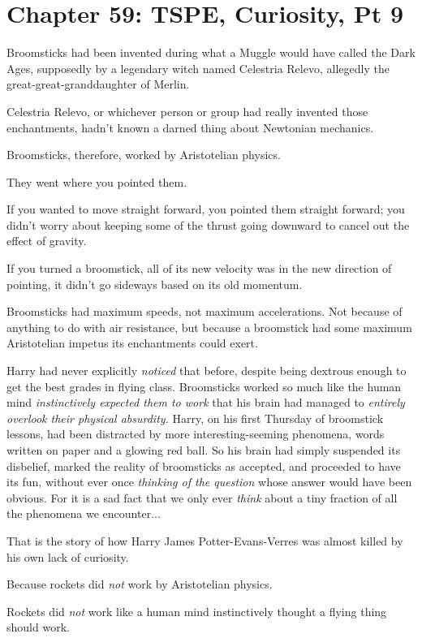 \chapter{Chapter 59: TSPE, Curiosity, Pt 9}
Broomsticks had been invented during what a Muggle would have called the Dark Ages, supposedly by a legendary witch named Celestria Relevo, allegedly the great-great-granddaughter of Merlin.

Celestria Relevo, or whichever person or group had really invented those enchantments, hadn't known a darned thing about Newtonian mechanics.

Broomsticks, therefore, worked by Aristotelian physics.

They went where you pointed them.

If you wanted to move straight forward, you pointed them straight forward; you didn't worry about keeping some of the thrust going downward to cancel out the effect of gravity.

If you turned a broomstick, all of its new velocity was in the new direction of pointing, it didn't go sideways based on its old momentum.

Broomsticks had maximum speeds, not maximum accelerations. Not because of anything to do with air resistance, but because a broomstick had some maximum Aristotelian impetus its enchantments could exert.

Harry had never explicitly \emph{noticed} that before, despite being dextrous enough to get the best grades in flying class. Broomsticks worked so much like the human mind \emph{instinctively expected them to work} that his brain had managed to \emph{entirely overlook their physical absurdity.} Harry, on his first Thursday of broomstick lessons, had been distracted by more interesting-seeming phenomena, words written on paper and a glowing red ball. So his brain had simply suspended its disbelief, marked the reality of broomsticks as accepted, and proceeded to have its fun, without ever once \emph{thinking of the question} whose answer would have been obvious. For it is a sad fact that we only ever \emph{think} about a tiny fraction of all the phenomena we encounter...

That is the story of how Harry James Potter-Evans-Verres was almost killed by his own lack of curiosity.

Because rockets did \emph{not} work by Aristotelian physics.

Rockets did \emph{not} work like a human mind instinctively thought a flying thing should work.

